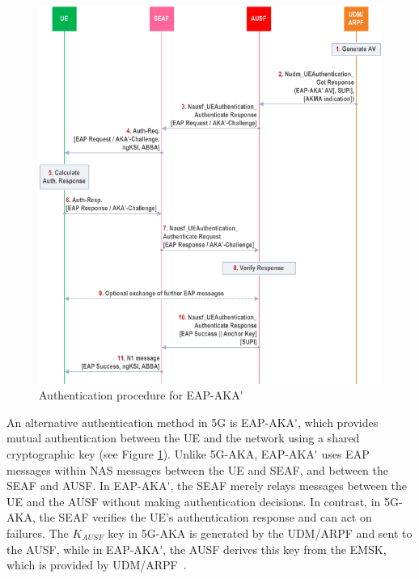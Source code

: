 \begin{figure}
    \centering
    \includegraphics[width=0.75\linewidth]{figs/Authentication procedure for EAP-AKA'.png}
    \caption{Authentication procedure for \acs{EAP-AKA'}}
    \label{fig:Authentication procedure for EAP-AKA'}
\end{figure}

\break

An alternative authentication method in \ac{5G} is \ac{EAP-AKA'}, which provides mutual authentication between the \ac{UE} and the network using a shared cryptographic key (see Figure \ref{fig:Authentication procedure for EAP-AKA'}). Unlike \ac{5G-AKA}, \ac{EAP-AKA'} uses \ac{EAP} messages within \ac{NAS} messages between the \ac{UE} and \ac{SEAF}, and between the \ac{SEAF} and \ac{AUSF}. In \ac{EAP-AKA'}, the \ac{SEAF} merely relays messages between the \ac{UE} and the \ac{AUSF} without making authentication decisions. In contrast, in \ac{5G-AKA}, the \ac{SEAF} verifies the \ac{UE}'s authentication response and can act on failures. The $K_{AUSF}$ key in \ac{5G-AKA} is generated by the \ac{UDM}/\ac{ARPF} and sent to the \ac{AUSF}, while in \ac{EAP-AKA'}, the \ac{AUSF} derives this key from the \ac{EMSK}, which is provided by \ac{UDM}/\ac{ARPF}~\cite{33.501-p49}.

